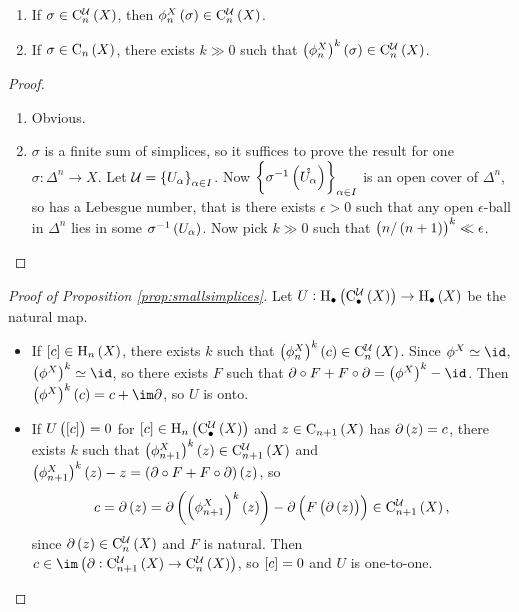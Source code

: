 \begin{corollary}
\hfill
\begin{enumerate}
\item If $ \sigma \in \C_n^\UUU\br{X} $, then $ \phi_n^X\br{\sigma} \in \C_n^\UUU\br{X} $.
\item If $ \sigma \in \C_n\br{X} $, there exists $ k \gg 0 $ such that $ \br{\phi_n^X}^k\br{\sigma} \in \C_n^\UUU\br{X} $.
\end{enumerate}
\end{corollary}

\begin{proof}
\hfill
\begin{enumerate}
\item Obvious.
\item $ \sigma $ is a finite sum of simplices, so it suffices to prove the result for one $ \sigma : \Delta^n \to X $. Let $ \UUU = \cbr{U_\alpha}_{\alpha \in I} $. Now $ \cbr{\sigma^{-1}\br{\mathring{U_\alpha}}}_{\alpha \in I} $ is an open cover of $ \Delta^n $, so has a Lebesgue number, that is there exists $ \epsilon > 0 $ such that any open $ \epsilon $-ball in $ \Delta^n $ lies in some $ \sigma^{-1}\br{U_\alpha} $. Now pick $ k \gg 0 $ such that $ \br{n / \br{n + 1}}^k \ll \epsilon $.
\end{enumerate}
\end{proof}

\begin{proof}[Proof of Proposition \ref{prop:smallsimplices}]
Let $ U : \H_\bullet\br{\C_\bullet^\UUU\br{X}} \to \H_\bullet\br{X} $ be the natural map.
\begin{itemize}
\item If $ \sbr{c} \in \H_n\br{X} $, there exists $ k $ such that $ \br{\phi_n^X}^k\br{c} \in \C_n^\UUU\br{X} $. Since $ \phi^X \simeq \id $, $ \br{\phi^X}^k \simeq \id $, so there exists $ F $ such that $ \da \circ F + F \circ \da = \br{\phi^X}^k - \id $. Then $ \br{\phi^X}^k\br{c} = c + \im \da $, so $ U $ is onto.
\item If $ U\br{\sbr{c}} = 0 $ for $ \sbr{c} \in \H_n\br{\C_\bullet^\UUU\br{X}} $ and $ z \in \C_{n + 1}\br{X} $ has $ \da\br{z} = c $, there exists $ k $ such that $ \br{\phi_{n + 1}^X}^k\br{z} \in \C_{n + 1}^\UUU\br{X} $ and $ \br{\phi_{n + 1}^X}^k\br{z} - z = \br{\da \circ F + F \circ \da}\br{z} $, so
$$ c = \da\br{z} = \da\br{\br{\phi_{n + 1}^X}^k\br{z}} - \da\br{F\br{\da\br{z}}} \in \C_{n + 1}^\UUU\br{X}, $$
since $ \da\br{z} \in \C_n^\UUU\br{X} $ and $ F $ is natural. Then $ c \in \im \br{\da : \C_{n + 1}^\UUU\br{X} \to \C_n^\UUU\br{X}} $, so $ \sbr{c} = 0 $ and $ U $ is one-to-one.
\end{itemize}
\end{proof}

